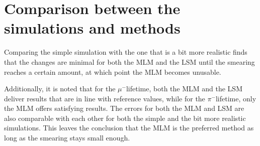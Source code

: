 \documentclass[11pt, a4paper, oneside]{book}
\newcommand{\pion}{$\pi^{-}$}
\newcommand{\muon}{$\mu^{-}$}
\begin{document}
\section{Comparison between the simulations and methods}
Comparing the simple simulation with the one that is a bit more realistic finds that the changes are minimal for both the MLM and the LSM until the smearing reaches a certain amount, at which point the MLM becomes unusable. 

Additionally, it is noted that for the \muon lifetime, both the MLM and the LSM deliver results that are in line with reference values, while for the \pion lifetime, only the MLM offers satisfying results. The errors for both the MLM and LSM are also comparable with each other for both the simple and the bit more realistic simulations. This leaves the conclusion that the MLM is the preferred method as long as the smearing stays small enough. 


\end{document}
